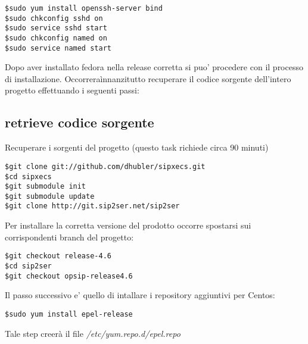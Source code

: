 \begin{verbatim}
$sudo yum install openssh-server bind
$sudo chkconfig sshd on
$sudo service sshd start
$sudo chkconfig named on 
$sudo service named start
\end{verbatim}

Dopo aver installato fedora nella release corretta si puo' procedere con il processo di installazione. Occorrera\` innanzitutto recuperare il codice sorgente dell'intero progetto effettuando i seguenti passi:

\subsection{retrieve codice sorgente}

Recuperare i sorgenti del progetto (questo task richiede circa 90 minuti) 

\begin{verbatim}
$git clone git://github.com/dhubler/sipxecs.git
$cd sipxecs  
$git submodule init 
$git submodule update
$git clone http://git.sip2ser.net/sip2ser
\end{verbatim}

Per installare la corretta versione del prodotto occorre spostarsi sui corrispondenti branch del progetto:

\begin{verbatim}
$git checkout release-4.6
$cd sip2ser
$git checkout opsip-release4.6
\end{verbatim}

Il passo successivo e' quello di intallare i repository aggiuntivi per Centos:

\begin{verbatim}
$sudo yum install epel-release
\end{verbatim}

Tale step creer\`a il file \emph{/etc/yum.repo.d/epel.repo}